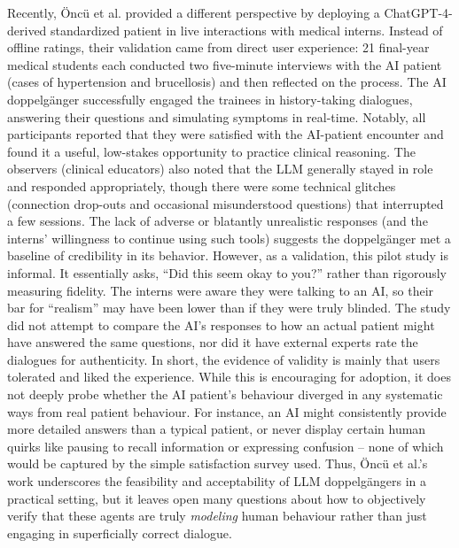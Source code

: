 Recently, Öncü et al. \cite{Oncu2025} provided a different perspective by deploying a ChatGPT-4-derived standardized patient in live interactions with medical interns. Instead of offline ratings, their validation came from direct user experience: 21 final-year medical students each conducted two five-minute interviews with the AI patient (cases of hypertension and brucellosis) and then reflected on the process. The AI doppelgänger successfully engaged the trainees in history-taking dialogues, answering their questions and simulating symptoms in real-time. Notably, all participants reported that they were satisfied with the AI-patient encounter and found it a useful, low-stakes opportunity to practice clinical reasoning. The observers (clinical educators) also noted that the LLM generally stayed in role and responded appropriately, though there were some technical glitches (connection drop-outs and occasional misunderstood questions) that interrupted a few sessions. The lack of adverse or blatantly unrealistic responses (and the interns’ willingness to continue using such tools) suggests the doppelgänger met a baseline of credibility in its behavior. However, as a validation, this pilot study is informal. It essentially asks, “Did this seem okay to you?” rather than rigorously measuring fidelity. The interns were aware they were talking to an AI, so their bar for “realism” may have been lower than if they were truly blinded. The study did not attempt to compare the AI’s responses to how an actual patient might have answered the same questions, nor did it have external experts rate the dialogues for authenticity. In short, the evidence of validity is mainly that users tolerated and liked the experience. While this is encouraging for adoption, it does not deeply probe whether the AI patient’s behaviour diverged in any systematic ways from real patient behaviour. For instance, an AI might consistently provide more detailed answers than a typical patient, or never display certain human quirks like pausing to recall information or expressing confusion – none of which would be captured by the simple satisfaction survey used. Thus, Öncü et al.’s work underscores the feasibility and acceptability of LLM doppelgängers in a practical setting, but it leaves open many questions about how to objectively verify that these agents are truly \emph{modeling} human behaviour rather than just engaging in superficially correct dialogue.


